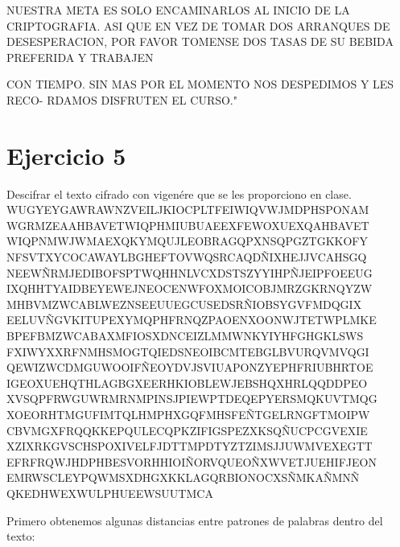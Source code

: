 \documentclass[12pt, letterpaper]{article}
\begin{document}
NUESTRA META ES SOLO ENCAMINARLOS AL INICIO DE LA CRIPTOGRAFIA.
ASI QUE EN VEZ DE TOMAR DOS ARRANQUES DE DESESPERACION, POR
FAVOR TOMENSE DOS TASAS DE SU BEBIDA PREFERIDA Y TRABAJEN

CON TIEMPO. SIN MAS POR EL MOMENTO NOS DESPEDIMOS Y LES RECO-
RDAMOS DISFRUTEN EL CURSO."
 
\section*{Ejercicio 5}
Descifrar el texto cifrado con vigenére que se les proporciono en clase.\\ 

WUGYEYGAWRAWNZVEILJKIOCPLTFEIWIQVWJMDPHSPONAM\\
WGRMZEAAHBAVETWIQPHMIUBUAEEXFEWOXUEXQAHBAVET\\
WIQPNMWJWMAEXQKYMQUJLEOBRAGQPXNSQPGZTGKKOFY\\
NFSVTXYCOCAWAYLBGHEFTOVWQSRCAQDÑIXHEJJVCAHSGQ\\
NEEWÑRMJEDIBOFSPTWQHHNLVCXDSTSZYYIHPÑJEIPFOEEUG\\
IXQHHTYAIDBEYEWEJNEOCENWFOXMOICOBJMRZGKRNQYZW\\
MHBVMZWCABLWEZNSEEUUEGCUSEDSRÑIOBSYGVFMDQGIX\\
EELUVÑGVKITUPEXYMQPHFRNQZPAOENXOONWJTETWPLMKE\\
BPEFBMZWCABAXMFIOSXDNCEIZLMMWNKYIYHFGHGKLSWS\\
FXIWYXXRFNMHSMOGTQIEDSNEOIBCMTEBGLBVURQVMVQGI\\
QEWIZWCDMGUWOOIFÑEOYDVJSVIUAPONZYEPHFRIUBHRTOE\\
IGEOXUEHQTHLAGBGXEERHKIOBLEWJEBSHQXHRLQQDDPEO\\
XVSQPFRWGUWRMRNMPINSJPIEWPTDEQEPYERSMQKUVTMQG\\
XOEORHTMGUFIMTQLHMPHXGQFMHSFEÑTGELRNGFTMOIPW\\
CBVMGXFRQQKKEPQULECQPKZIFIGSPEZXKSQÑUCPCGVEXIE\\
XZIXRKGVSCHSPOXIVELFJDTTMPDTYZTZIMSJJUWMVEXEGTT\\
EFRFRQWJHDPHBESVORHHIOIÑORVQUEOÑXWVETJUEHIFJEON\\
EMRWSCLEYPQWMSXDHGXKKLAGQRBIONOCXSÑMKAÑMNÑ\\
QKEDHWEXWULPHUEEWSUUTMCA

Primero obtenemos algunas distancias entre patrones de palabras dentro del texto:\\
\end{document}
